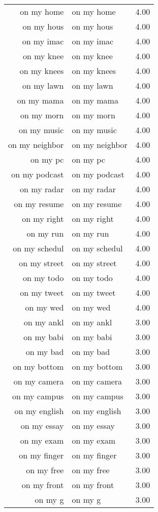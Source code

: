 \begin{table}[ht]
\begin{tabular}{rlr}
  on my home & on my home & 4.00 \\ 
  on my hous & on my hous & 4.00 \\ 
  on my imac & on my imac & 4.00 \\ 
  on my knee & on my knee & 4.00 \\ 
  on my knees & on my knees & 4.00 \\ 
  on my lawn & on my lawn & 4.00 \\ 
  on my mama & on my mama & 4.00 \\ 
  on my morn & on my morn & 4.00 \\ 
  on my music & on my music & 4.00 \\ 
  on my neighbor & on my neighbor & 4.00 \\ 
  on my pc & on my pc & 4.00 \\ 
  on my podcast & on my podcast & 4.00 \\ 
  on my radar & on my radar & 4.00 \\ 
  on my resume & on my resume & 4.00 \\ 
  on my right & on my right & 4.00 \\ 
  on my run & on my run & 4.00 \\ 
  on my schedul & on my schedul & 4.00 \\ 
  on my street & on my street & 4.00 \\ 
  on my todo & on my todo & 4.00 \\ 
  on my tweet & on my tweet & 4.00 \\ 
  on my wed & on my wed & 4.00 \\ 
  on my ankl & on my ankl & 3.00 \\ 
  on my babi & on my babi & 3.00 \\ 
  on my bad & on my bad & 3.00 \\ 
  on my bottom & on my bottom & 3.00 \\ 
  on my camera & on my camera & 3.00 \\ 
  on my campus & on my campus & 3.00 \\ 
  on my english & on my english & 3.00 \\ 
  on my essay & on my essay & 3.00 \\ 
  on my exam & on my exam & 3.00 \\ 
  on my finger & on my finger & 3.00 \\ 
  on my free & on my free & 3.00 \\ 
  on my front & on my front & 3.00 \\ 
  on my g & on my g & 3.00 \\ 

\end{tabular}
\end{table}
